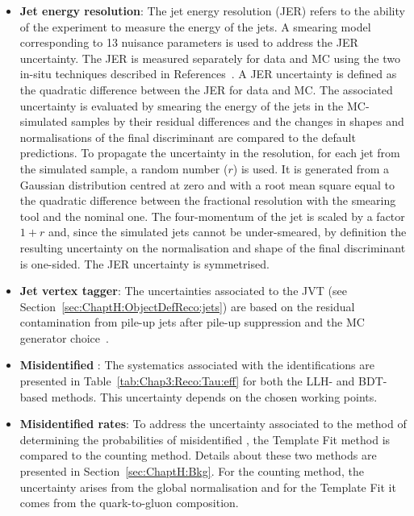 \begin{itemize}
	\item \textbf{Jet energy resolution}: The jet energy resolution (JER) refers to the ability of the
		experiment to measure the energy of the jets. A smearing model corresponding to 13 
		nuisance parameters is used to address  the JER uncertainty.
		The JER is measured separately for data and MC using the two in-situ techniques
		described in References~\cite{ATLAS:2020cli, ATLAS:2017bje}. A JER uncertainty is 
		defined as the quadratic difference between the JER for data and MC. The associated uncertainty
		is evaluated by smearing the energy of the jets in the MC-simulated samples by their residual
		differences and the changes in shapes and normalisations of the final discriminant are 
		compared to the default predictions.%
		To propagate the uncertainty in the \pT resolution, for each jet from the simulated sample, a random 
		number ($r$)  is used. It is generated from a Gaussian distribution centred at zero and with a root mean square equal to
		the quadratic difference between the fractional \pT resolution with the smearing tool and the nominal one. 
		The  four-momentum of the jet is scaled by a factor $1+r$ and, since the simulated jets cannot be
		under-smeared, by definition the resulting uncertainty on the normalisation and shape of the final 
		discriminant is one-sided. The JER uncertainty is symmetrised. 

	\item \textbf{Jet vertex tagger}: The uncertainties associated to the JVT (see 
		Section~\ref{sec:ChaptH:ObjectDefReco:jets}) are based on the residual 
		contamination from pile-up jets after pile-up suppression and the MC 
		generator choice~\cite{ATLAS-CONF-2014-018,ATLAS:2017ywy}.
	
	\item \textbf{Misidentified \tauhad}: 
		The systematics associated with the \tauhad  identifications are presented
		in Table~\ref{tab:Chap3:Reco:Tau:eff}
		for both the LLH- and BDT-based methods. This uncertainty depends on
		the chosen working points.
	
	\item \textbf{Misidentified \tauhad rates}: To address the uncertainty associated to the method
		of determining the probabilities of misidentified \tauhad, the Template Fit method is 
		compared to the counting method. Details about these two methods are
		presented in Section~\ref{sec:ChaptH:Bkg}.
		For the counting method, the uncertainty arises from the global normalisation
		and for the Template Fit it comes from the quark-to-gluon composition.
	

\end{itemize}
